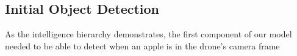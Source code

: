 \subsection{Initial Object Detection}
As the intelligence hierarchy demonstrates, the first component of our model needed to be able to detect when an apple is in the drone's camera frame